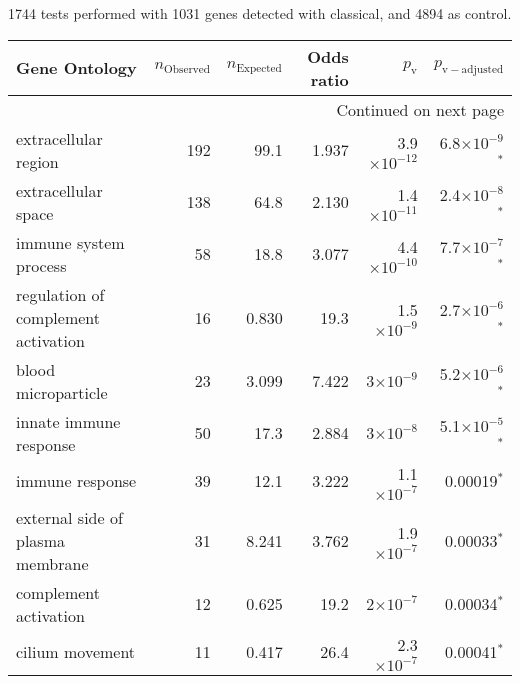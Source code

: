 1744 tests performed with 1031 genes detected with classical, and 4894 as control.\scriptsize
\begin{longtable}{|l|r|r|r|r|r|}
\toprule
                                Gene Ontology & $n_{\mathrm{Observed}}$ & $n_{\mathrm{Expected}}$ & Odds ratio &     $p_{\mathrm{v}}$ &     $p_{\mathrm{v-adjusted}}$ \\
\midrule
\endhead
\midrule
\multicolumn{6}{r}{{Continued on next page}} \\
\midrule
\endfoot

\bottomrule
\endlastfoot
                         extracellular region &                     192 &                    99.1 &      1.937 & 3.9$\times 10^{-12}$ &  6.8$\times 10^{-9}$$\bm{^*}$ \\
                          extracellular space &                     138 &                    64.8 &      2.130 & 1.4$\times 10^{-11}$ &  2.4$\times 10^{-8}$$\bm{^*}$ \\
                        immune system process &                      58 &                    18.8 &      3.077 & 4.4$\times 10^{-10}$ &  7.7$\times 10^{-7}$$\bm{^*}$ \\
          regulation of complement activation &                      16 &                   0.830 &       19.3 &  1.5$\times 10^{-9}$ &  2.7$\times 10^{-6}$$\bm{^*}$ \\
                          blood microparticle &                      23 &                   3.099 &      7.422 &    3$\times 10^{-9}$ &  5.2$\times 10^{-6}$$\bm{^*}$ \\
                       innate immune response &                      50 &                    17.3 &      2.884 &    3$\times 10^{-8}$ &  5.1$\times 10^{-5}$$\bm{^*}$ \\
                              immune response &                      39 &                    12.1 &      3.222 &  1.1$\times 10^{-7}$ &              0.00019$\bm{^*}$ \\
             external side of plasma membrane &                      31 &                   8.241 &      3.762 &  1.9$\times 10^{-7}$ &              0.00033$\bm{^*}$ \\
                        complement activation &                      12 &                   0.625 &       19.2 &    2$\times 10^{-7}$ &              0.00034$\bm{^*}$ \\
                              cilium movement &                      11 &                   0.417 &       26.4 &  2.3$\times 10^{-7}$ &              0.00041$\bm{^*}$ \\

\end{longtable}
